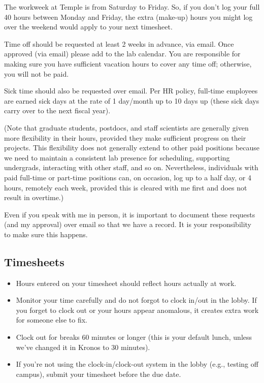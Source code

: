 \documentclass[letterpaper,12pt,oneside]{memoir}
\begin{document}
The workweek at Temple is from Saturday to Friday. So, if you don't log your full 40 hours between Monday and Friday, the extra (make-up) hours you might log over the weekend would apply to your next timesheet. 

Time off should be requested at least 2 weeks in advance, via email. Once approved (via email) please add to the lab calendar. You are responsible for making sure you have sufficient vacation hours to cover any time off; otherwise, you will not be paid.

Sick time should also be requested over email. Per HR policy, full-time employees are earned sick days at the rate of 1 day/month up to 10 days up (these sick days carry over to the next fiscal year).

(Note that graduate students, postdocs, and staff scientists are generally given more flexibility in their hours, provided they make sufficient progress on their projects. This flexibility does not generally extend to other paid positions because we need to maintain a consistent lab presence for scheduling, supporting undergrads, interacting with other staff, and so on. Nevertheless, individuals with paid full-time or part-time positions can, on occasion, log up to a half day, or 4 hours, remotely each week, provided this is cleared with me first and does not result in overtime.)

\begin{shaded}
\noindent Even if you speak with me in person, it is important to document these requests (and my approval) over email so that we have a record. It is your responsibility to make sure this happens.
\end{shaded}

\subsection{Timesheets}

\begin{itemize}
\item Hours entered on your timesheet should reflect hours actually at work.
\item Monitor your time carefully and do not forgot to clock in/out in the lobby. If you forget to clock out or your hours appear anomalous, it creates extra work for someone else to fix. 
\item Clock out for breaks 60 minutes or longer (this is your default lunch, unless we've changed it in Kronos to 30 minutes).
\item If you're not using the clock-in/clock-out system in the lobby (e.g., testing off campus), submit your timesheet before the due date.
\end{itemize}
\end{document}
